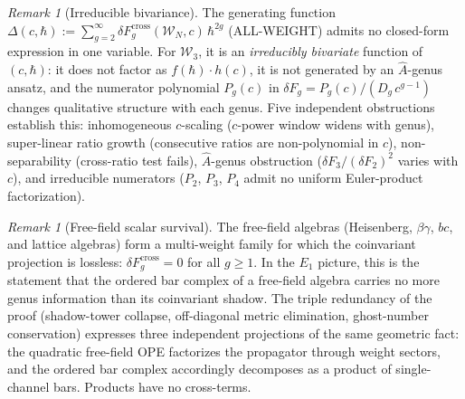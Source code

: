 \documentclass[11pt]{article}
\theoremstyle{definition}
\theoremstyle{remark}
\newtheorem{remark}[theorem]{Remark}
\newcommand{\Walg}{\mathcal{W}}
\newcommand{\cross}{\mathrm{cross}}
\numberwithin{equation}{section}
\begin{document}
\begin{remark}[Irreducible bivariance]\label{rem:bivariance}
The generating function
$\Delta(c, \hbar)
:= \sum_{g=2}^{\infty}
\delta F_g^{\cross}(\Walg_N, c)\,\hbar^{2g}$
(ALL-WEIGHT)
admits no closed-form expression in one variable.
For $\Walg_3$, it is an \emph{irreducibly bivariate}
function of $(c, \hbar)$: it does not factor as
$f(\hbar) \cdot h(c)$, it is not generated by an
$\hat{A}$-genus ansatz, and the numerator polynomial
$P_g(c)$ in
$\delta F_g = P_g(c)/(D_g\,c^{g-1})$
changes qualitative structure with each genus.
Five independent obstructions establish this:
inhomogeneous $c$-scaling ($c$-power window widens with
genus), super-linear ratio growth (consecutive ratios are
non-polynomial in $c$), non-separability (cross-ratio test
fails), $\hat{A}$-genus obstruction
($\delta F_3/(\delta F_2)^2$ varies with $c$), and
irreducible numerators ($P_2$, $P_3$, $P_4$ admit no uniform
Euler-product factorization).
\end{remark}

\begin{remark}[Free-field scalar survival]\label{rem:free-field-unique}
The free-field algebras (Heisenberg, $\beta\gamma$, $bc$,
and lattice algebras) form a multi-weight family for which the
coinvariant projection is lossless:
$\delta F_g^{\cross} = 0$ for all $g \geq 1$.
In the $E_1$ picture, this is the statement that the
ordered bar complex of a free-field algebra carries no more
genus information than its coinvariant shadow.
The triple redundancy of the proof
(shadow-tower collapse, off-diagonal metric elimination,
ghost-number conservation) expresses three independent
projections of the same geometric fact: the quadratic
free-field OPE factorizes the propagator through weight
sectors, and the ordered bar complex accordingly
decomposes as a product of single-channel bars.
Products have no cross-terms.
\end{remark}
\end{document}
